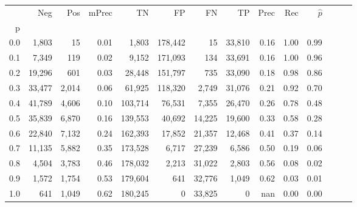\begin{tabular}{rrrrrrrrrrrrrr}
\toprule
{} &     Neg &    Pos & mPrec &       TN &       FP &      FN &      TP &  Prec &   Rec & $\hat{p}$ \\
p   &         &        &       &          &          &         &         &       &       &           \\
\midrule
0.0 &   1,803 &     15 &  0.01 &    1,803 &  178,442 &      15 &  33,810 &  0.16 &  1.00 &      0.99 \\
0.1 &   7,349 &    119 &  0.02 &    9,152 &  171,093 &     134 &  33,691 &  0.16 &  1.00 &      0.96 \\
0.2 &  19,296 &    601 &  0.03 &   28,448 &  151,797 &     735 &  33,090 &  0.18 &  0.98 &      0.86 \\
0.3 &  33,477 &  2,014 &  0.06 &   61,925 &  118,320 &   2,749 &  31,076 &  0.21 &  0.92 &      0.70 \\
0.4 &  41,789 &  4,606 &  0.10 &  103,714 &   76,531 &   7,355 &  26,470 &  0.26 &  0.78 &      0.48 \\
0.5 &  35,839 &  6,870 &  0.16 &  139,553 &   40,692 &  14,225 &  19,600 &  0.33 &  0.58 &      0.28 \\
0.6 &  22,840 &  7,132 &  0.24 &  162,393 &   17,852 &  21,357 &  12,468 &  0.41 &  0.37 &      0.14 \\
0.7 &  11,135 &  5,882 &  0.35 &  173,528 &    6,717 &  27,239 &   6,586 &  0.50 &  0.19 &      0.06 \\
0.8 &   4,504 &  3,783 &  0.46 &  178,032 &    2,213 &  31,022 &   2,803 &  0.56 &  0.08 &      0.02 \\
0.9 &   1,572 &  1,754 &  0.53 &  179,604 &      641 &  32,776 &   1,049 &  0.62 &  0.03 &      0.01 \\
1.0 &     641 &  1,049 &  0.62 &  180,245 &        0 &  33,825 &       0 &   nan &  0.00 &      0.00 \\
\bottomrule
\end{tabular}
